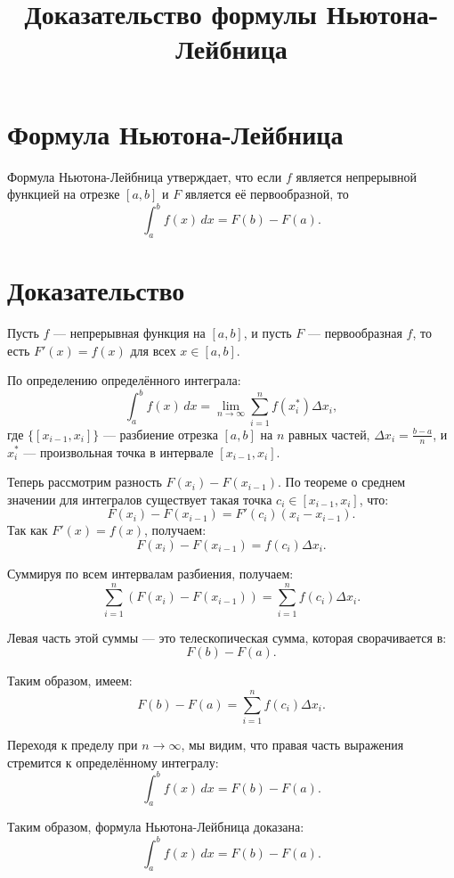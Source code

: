 \documentclass{article}
\title{Доказательство формулы Ньютона-Лейбница}
\author{}
\date{}
\begin{document}
\maketitle

\section*{Формула Ньютона-Лейбница}

Формула Ньютона-Лейбница утверждает, что если \( f \) является непрерывной функцией на отрезке \([a, b]\) и \( F \) является её первообразной, то
\[
\int_{a}^{b} f(x) \, dx = F(b) - F(a).
\]

\section*{Доказательство}

Пусть \( f \) — непрерывная функция на \([a, b]\), и пусть \( F \) — первообразная \( f \), то есть \( F'(x) = f(x) \) для всех \( x \in [a, b] \).

По определению определённого интеграла:
\[
\int_{a}^{b} f(x) \, dx = \lim_{n \to \infty} \sum_{i=1}^{n} f(x_i^*) \Delta x_i,
\]
где \( \{[x_{i-1}, x_i]\} \) — разбиение отрезка \([a, b]\) на \( n \) равных частей, \( \Delta x_i = \frac{b-a}{n} \), и \( x_i^* \) — произвольная точка в интервале \( [x_{i-1}, x_i] \).

Теперь рассмотрим разность \( F(x_i) - F(x_{i-1}) \). По теореме о среднем значении для интегралов существует такая точка \( c_i \in [x_{i-1}, x_i] \), что:
\[
F(x_i) - F(x_{i-1}) = F'(c_i) (x_i - x_{i-1}).
\]
Так как \( F'(x) = f(x) \), получаем:
\[
F(x_i) - F(x_{i-1}) = f(c_i) \Delta x_i.
\]

Суммируя по всем интервалам разбиения, получаем:
\[
\sum_{i=1}^{n} (F(x_i) - F(x_{i-1})) = \sum_{i=1}^{n} f(c_i) \Delta x_i.
\]

Левая часть этой суммы — это телескопическая сумма, которая сворачивается в:
\[
F(b) - F(a).
\]

Таким образом, имеем:
\[
F(b) - F(a) = \sum_{i=1}^{n} f(c_i) \Delta x_i.
\]

Переходя к пределу при \( n \to \infty \), мы видим, что правая часть выражения стремится к определённому интегралу:
\[
\int_{a}^{b} f(x) \, dx = F(b) - F(a).
\]

Таким образом, формула Ньютона-Лейбница доказана:
\[
\int_{a}^{b} f(x) \, dx = F(b) - F(a).
\]
\end{document}
